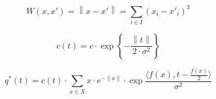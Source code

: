 \begin{equation*}
  W \left( x, x' \right)
  = \left\| x - x' \right\|
  = \sum_{i \in I} \left( x_i - x'_i \right)^2
\end{equation*}

\begin{equation*}
  c\left( t \right)
  = c \cdot \exp{\left\{- \frac{\left\| t \right\|}{2 \cdot \sigma^2}\right\}}
\end{equation*}

\begin{equation*}
  q^* \left( t \right)
  = c\left( t \right)
    \cdot \sum_{x \in X}
      x
      \cdot e^{- \left\| x \right\|}
      \cdot \exp{\frac{\langle f\left(x\right),
        t - \frac{f\left(x\right)}{2} \rangle}{\sigma^2}}
\end{equation*}
